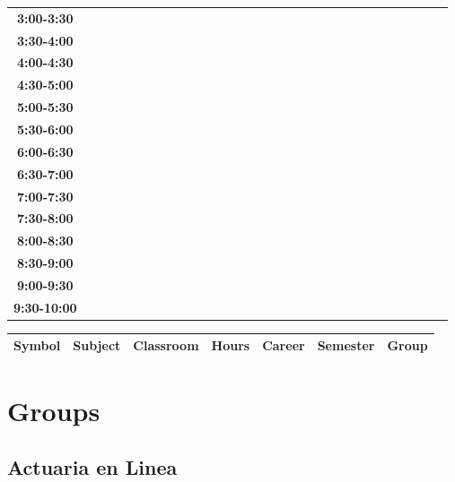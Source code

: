 \documentclass{article}
\begin{document}
\begin{table}[ht]
\begin{tabular}{|c|c|c|c|c|c|c|c|c|c|c|c|c|c|c|c|c|c|c|c|c|c|c|c|c|c|c|c|c|c|}
\textbf{3:00-3:30} &   &   &   &   &   &   &   \\
 \cline{1-8} 
\textbf{3:30-4:00} &   &   &   &   &   &   &   \\
 \cline{1-8} 
\textbf{4:00-4:30} &   &   &   &   &   &   &   \\
 \cline{1-8} 
\textbf{4:30-5:00} &   &   &   &   &   &   &   \\
 \cline{1-8} 
\textbf{5:00-5:30} &   &   &   &   &   &   &   \\
 \cline{1-8} 
\textbf{5:30-6:00} &   &   &   &   &   &   &   \\
 \cline{1-8} 
\textbf{6:00-6:30} &   &   &   &   &   &   &   \\
 \cline{1-8} 
\textbf{6:30-7:00} &   &   &   &   &   &   &   \\
 \cline{1-8} 
\textbf{7:00-7:30} &   &   &   &   &   &   &   \\
 \cline{1-8} 
\textbf{7:30-8:00} &   &   &   &   &   &   &   \\
 \cline{1-8} 
\textbf{8:00-8:30} &   &   &   &   &   &   &   \\
 \cline{1-8} 
\textbf{8:30-9:00} &   &   &   &   &   &   &   \\
 \cline{1-8} 
\textbf{9:00-9:30} &   &   &   &   &   &   &   \\
 \cline{1-8} 
\textbf{9:30-10:00} &   &   &   &   &   &   &   \\
 \cline{1-8} 
\end{tabular}\end{table}

        
        \begin{tabular}{|>{\centering\arraybackslash}m{2cm}|>{\centering\arraybackslash}m{4cm}|>{\centering\arraybackslash}m{2cm}|>{\centering\arraybackslash}m{2cm}|>{\centering\arraybackslash}m{2cm}|>{\centering\arraybackslash}m{2cm}|>{\centering\arraybackslash}m{2cm}|}
        \hline
        \textbf{Symbol} & \textbf{Subject} & \textbf{Classroom} & \textbf{Hours} & \textbf{Career} & \textbf{Semester} & \textbf{Group} \\
        \hline
        \end{tabular}
                    

        \newpage
        


        \section{Groups} 
\subsection{Actuaria en Linea}
\end{document}
